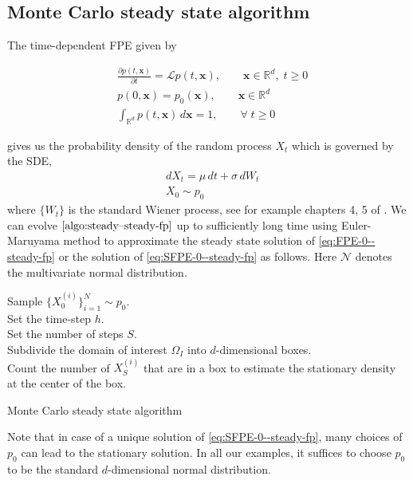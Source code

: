 \subsection{Monte Carlo steady state algorithm}\label{ssec-MC-algo--steady-fp}
The time-dependent FPE given by 


\begin{equation}
\begin{aligned}
    &\frac{\partial  p(t, \mathbf x)}{\partial t} =\mathcal L p(t, \mathbf x),\qquad\mathbf x\in\mathbb R^d,\; t\ge0\\&p(0, \mathbf x)=p_0(\mathbf x),\qquad\mathbf x\in\mathbb R^d\\
    &\int_{\mathbb R^d}p(t,\mathbf x)\,d\mathbf x = 1,\qquad\forall\;t\ge0
    \label{eq:FPE-0--steady-fp}
\end{aligned}
\end{equation}


gives us the probability density of the random process $X_t$ which is governed by the SDE,
\begin{equation}
\begin{aligned}
    &dX_t=\mu\,dt+\sigma\,dW_t\\
    &X_0\sim p_0\label{eq:SDE-0--steady-fp}
\end{aligned}
\end{equation}where $\{W_t\}$ is the standard Wiener process, see for example chapters 4, 5 of \cite{gardiner2009stochastic}. We can evolve $\eqref{algo:steady--steady-fp}$ up to sufficiently long time using Euler-Maruyama method \cite{kloeden1992stochastic} to approximate the steady state solution of \eqref{eq:FPE-0--steady-fp} or the solution of \eqref{eq:SFPE-0--steady-fp} as follows. Here $\mathcal N$ denotes the multivariate normal distribution.
\begin{algorithm}[!ht]
Sample $\{ X_0^{(i)}\}_{i=1}^N\sim p_0$.\\
Set the time-step $h$.\\
Set the number of steps $S$.\\
Subdivide the domain of interest $\Omega_I$ into $d$-dimensional boxes.\\ Count the number of $X^{(i)}_{S}$ that are in a box to estimate the stationary density at the center of the box.
\caption{Monte Carlo steady state algorithm}\label{algo:MC--steady-fp}
\end{algorithm}
Note that in case of a unique solution of \eqref{eq:SFPE-0--steady-fp}, many choices of $p_0$ can lead to the stationary solution. In all our examples, it suffices to choose $p_0$ to be the standard $d$-dimensional normal distribution.

